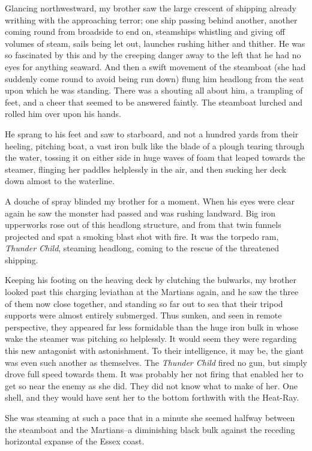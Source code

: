 Glancing northwestward, my brother saw the large crescent of
shipping already writhing with the approaching terror; one ship
passing behind another, another coming round from broadside to end
on, steamships whistling and giving off volumes of steam, sails
being let out, launches rushing hither and thither. He was so
fascinated by this and by the creeping danger away to the left that
he had no eyes for anything seaward. And then a swift movement of
the steamboat (she had suddenly come round to avoid being run down)
flung him headlong from the seat upon which he was standing. There
was a shouting all about him, a trampling of feet, and a cheer that
seemed to be answered faintly. The steamboat lurched and rolled him
over upon his hands.

He sprang to his feet and saw to starboard, and not a hundred yards
from their heeling, pitching boat, a vast iron bulk like the blade
of a plough tearing through the water, tossing it on either side in
huge waves of foam that leaped towards the steamer, flinging her
paddles helplessly in the air, and then sucking her deck down
almost to the waterline.

A douche of spray blinded my brother for a moment. When his eyes
were clear again he saw the monster had passed and was rushing
landward. Big iron upperworks rose out of this headlong structure,
and from that twin funnels projected and spat a smoking blast shot
with fire. It was the torpedo ram, \emph{Thunder Child}, steaming
headlong, coming to the rescue of the threatened shipping.

Keeping his footing on the heaving deck by clutching the bulwarks,
my brother looked past this charging leviathan at the Martians
again, and he saw the three of them now close together, and
standing so far out to sea that their tripod supports were almost
entirely submerged. Thus sunken, and seen in remote perspective,
they appeared far less formidable than the huge iron bulk in whose
wake the steamer was pitching so helplessly. It would seem they
were regarding this new antagonist with astonishment. To their
intelligence, it may be, the giant was even such another as
themselves. The \emph{Thunder Child} fired no gun, but simply drove
full speed towards them. It was probably her not firing that
enabled her to get so near the enemy as she did. They did not know
what to make of her. One shell, and they would have sent her to the
bottom forthwith with the Heat-Ray.

She was steaming at such a pace that in a minute she seemed halfway
between the steamboat and the Martians--a diminishing black bulk
against the receding horizontal expanse of the Essex coast.

